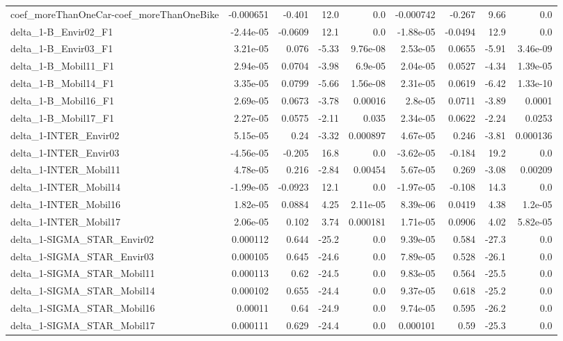 \begin{tabular}{lrrrrrrrr}
coef_moreThanOneCar-coef_moreThanOneBike & -0.000651 & -0.401 & 12.0 & 0.0 & -0.000742 & -0.267 & 9.66 & 0.0 \\
delta_1-B_Envir02_F1 & -2.44e-05 & -0.0609 & 12.1 & 0.0 & -1.88e-05 & -0.0494 & 12.9 & 0.0 \\
delta_1-B_Envir03_F1 & 3.21e-05 & 0.076 & -5.33 & 9.76e-08 & 2.53e-05 & 0.0655 & -5.91 & 3.46e-09 \\
delta_1-B_Mobil11_F1 & 2.94e-05 & 0.0704 & -3.98 & 6.9e-05 & 2.04e-05 & 0.0527 & -4.34 & 1.39e-05 \\
delta_1-B_Mobil14_F1 & 3.35e-05 & 0.0799 & -5.66 & 1.56e-08 & 2.31e-05 & 0.0619 & -6.42 & 1.33e-10 \\
delta_1-B_Mobil16_F1 & 2.69e-05 & 0.0673 & -3.78 & 0.00016 & 2.8e-05 & 0.0711 & -3.89 & 0.0001 \\
delta_1-B_Mobil17_F1 & 2.27e-05 & 0.0575 & -2.11 & 0.035 & 2.34e-05 & 0.0622 & -2.24 & 0.0253 \\
delta_1-INTER_Envir02 & 5.15e-05 & 0.24 & -3.32 & 0.000897 & 4.67e-05 & 0.246 & -3.81 & 0.000136 \\
delta_1-INTER_Envir03 & -4.56e-05 & -0.205 & 16.8 & 0.0 & -3.62e-05 & -0.184 & 19.2 & 0.0 \\
delta_1-INTER_Mobil11 & 4.78e-05 & 0.216 & -2.84 & 0.00454 & 5.67e-05 & 0.269 & -3.08 & 0.00209 \\
delta_1-INTER_Mobil14 & -1.99e-05 & -0.0923 & 12.1 & 0.0 & -1.97e-05 & -0.108 & 14.3 & 0.0 \\
delta_1-INTER_Mobil16 & 1.82e-05 & 0.0884 & 4.25 & 2.11e-05 & 8.39e-06 & 0.0419 & 4.38 & 1.2e-05 \\
delta_1-INTER_Mobil17 & 2.06e-05 & 0.102 & 3.74 & 0.000181 & 1.71e-05 & 0.0906 & 4.02 & 5.82e-05 \\
delta_1-SIGMA_STAR_Envir02 & 0.000112 & 0.644 & -25.2 & 0.0 & 9.39e-05 & 0.584 & -27.3 & 0.0 \\
delta_1-SIGMA_STAR_Envir03 & 0.000105 & 0.645 & -24.6 & 0.0 & 7.89e-05 & 0.528 & -26.1 & 0.0 \\
delta_1-SIGMA_STAR_Mobil11 & 0.000113 & 0.62 & -24.5 & 0.0 & 9.83e-05 & 0.564 & -25.5 & 0.0 \\
delta_1-SIGMA_STAR_Mobil14 & 0.000102 & 0.655 & -24.4 & 0.0 & 9.37e-05 & 0.618 & -25.2 & 0.0 \\
delta_1-SIGMA_STAR_Mobil16 & 0.00011 & 0.64 & -24.9 & 0.0 & 9.74e-05 & 0.595 & -26.2 & 0.0 \\
delta_1-SIGMA_STAR_Mobil17 & 0.000111 & 0.629 & -24.4 & 0.0 & 0.000101 & 0.59 & -25.3 & 0.0 \\

\end{tabular}
